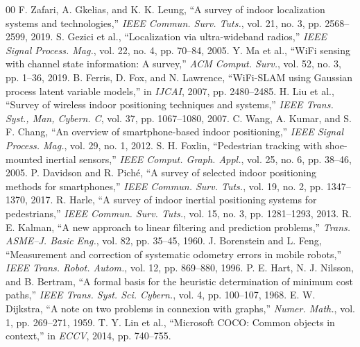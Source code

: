\documentclass[conference]{IEEEtran}
\begin{document}
\begin{thebibliography}{00}
 F. Zafari, A. Gkelias, and K. K. Leung, ``A survey of indoor localization systems and technologies,'' \textit{IEEE Commun. Surv. Tuts.}, vol. 21, no. 3, pp. 2568--2599, 2019.
 S. Gezici et al., ``Localization via ultra-wideband radios,'' \textit{IEEE Signal Process. Mag.}, vol. 22, no. 4, pp. 70--84, 2005.
 Y. Ma et al., ``WiFi sensing with channel state information: A survey,'' \textit{ACM Comput. Surv.}, vol. 52, no. 3, pp. 1--36, 2019.
 B. Ferris, D. Fox, and N. Lawrence, ``WiFi-SLAM using Gaussian process latent variable models,'' in \textit{IJCAI}, 2007, pp. 2480--2485.
 H. Liu et al., ``Survey of wireless indoor positioning techniques and systems,'' \textit{IEEE Trans. Syst., Man, Cybern. C}, vol. 37, pp. 1067--1080, 2007.
 C. Wang, A. Kumar, and S. F. Chang, ``An overview of smartphone-based indoor positioning,'' \textit{IEEE Signal Process. Mag.}, vol. 29, no. 1, 2012.
 S. H. Foxlin, ``Pedestrian tracking with shoe-mounted inertial sensors,'' \textit{IEEE Comput. Graph. Appl.}, vol. 25, no. 6, pp. 38--46, 2005.
 P. Davidson and R. Pich\'{e}, ``A survey of selected indoor positioning methods for smartphones,'' \textit{IEEE Commun. Surv. Tuts.}, vol. 19, no. 2, pp. 1347--1370, 2017.
 R. Harle, ``A survey of indoor inertial positioning systems for pedestrians,'' \textit{IEEE Commun. Surv. Tuts.}, vol. 15, no. 3, pp. 1281--1293, 2013.
 R. E. Kalman, ``A new approach to linear filtering and prediction problems,'' \textit{Trans. ASME--J. Basic Eng.}, vol. 82, pp. 35--45, 1960.
 J. Borenstein and L. Feng, ``Measurement and correction of systematic odometry errors in mobile robots,'' \textit{IEEE Trans. Robot. Autom.}, vol. 12, pp. 869--880, 1996.
 P. E. Hart, N. J. Nilsson, and B. Bertram, ``A formal basis for the heuristic determination of minimum cost paths,'' \textit{IEEE Trans. Syst. Sci. Cybern.}, vol. 4, pp. 100--107, 1968.
 E. W. Dijkstra, ``A note on two problems in connexion with graphs,'' \textit{Numer. Math.}, vol. 1, pp. 269--271, 1959.
 T. Y. Lin et al., ``Microsoft COCO: Common objects in context,'' in \textit{ECCV}, 2014, pp. 740--755.
\end{thebibliography}
\end{document}
